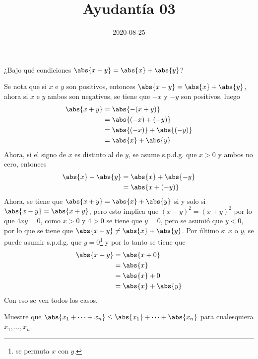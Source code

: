 \documentclass{ayudantia}
\title{Ayudantía 03}
\date{2020-08-25}
\begin{document}
\maketitle

\begin{prob}
    ¿Bajo qué condiciones \(\abs{x+y}=\abs{x}+\abs{y}\)?
\end{prob}

\begin{ans}
    \begin{sol}
        Se nota que si \(x\) e \(y\) son positivos, entonces \(\abs{x+y}=\abs{x}+\abs{y}\), ahora si \(x\) e \(y\) ambos son negativos, se tiene que \(-x\) y \(-y\) son positivos, luego
        \begin{align*}
            \abs{x+y}&=\abs{-(x+y)}\\
            &=\abs{(-x)+(-y)}\\
            &=\abs{(-x)}+\abs{(-y)}\\
            &=\abs{x}+\abs{y}
        \end{align*}
        Ahora, si el signo de \(x\) es distinto al de \(y\), se asume s.p.d.g. que \(x>0\) y ambos no cero, entonces
        \begin{align*}
            \abs{x}+\abs{y}&=\abs{x}+\abs{-y}\\
            &=\abs{x+(-y)}
        \end{align*}
        Ahora, se tiene que \(\abs{x+y}=\abs{x}+\abs{y}\) si y solo si \(\abs{x-y}=\abs{x+y}\), pero esto implica que \((x-y)^2=(x+y)^2\) por lo que \(4xy=0\), como \(x>0\) y \(4>0\) se tiene que \(y=0\), pero se asumió que \(y<0\), por lo que se tiene que \(\abs{x+y}\neq\abs{x}+\abs{y}\). Por último si \(x\) o \(y\), se puede asumir s.p.d.g. que \(y=0\)\footnote{se permuta \(x\) con \(y\).} y por lo tanto se tiene que
        \begin{align*}
            \abs{x+y}&=\abs{x+0}\\
            &=\abs{x}\\
            &=\abs{x}+0\\
            &=\abs{x}+\abs{y}\\
        \end{align*}
        Con eso se ven todos los casos.
    \end{sol}
\end{ans}


\begin{prob}
    Muestre que \(\abs{x_1+\dots+x_n}\leq\abs{x_1}+\dots+\abs{x_n}\) para cualesquiera \(x_1,\dots,x_n\).
\end{prob}
\end{document}
